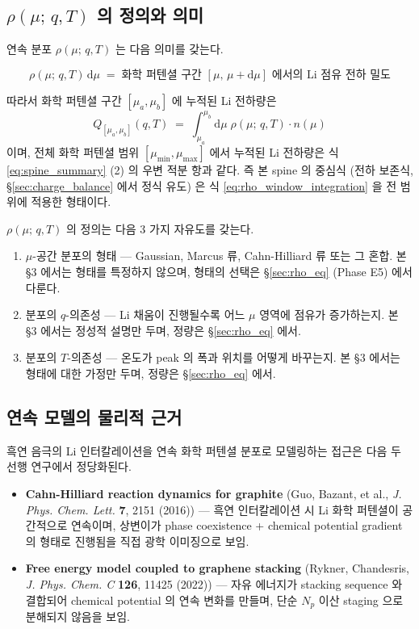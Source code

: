 \documentclass[11pt,a4paper]{article}
\newcommand{\dd}{\mathrm{d}}
\newcommand{\mucont}{\mu}
\newcommand{\rhomu}{\rho(\mucont;\, q, T)}
\newcommand{\nmu}{n(\mucont)}
\begin{document}
\subsection{$\rhomu$ 의 정의와 의미}
\label{sec:rho_definition}

연속 분포 $\rhomu$ 는 다음 의미를 갖는다.

\begin{equation}
\rhomu \, \dd\mucont \;=\;
\text{화학 퍼텐셜 구간 } [\mucont,\, \mucont + \dd\mucont] \text{ 에서의 Li
점유 전하 밀도}
\label{eq:rho_meaning}
\end{equation}

따라서 화학 퍼텐셜 구간 $[\mucont_a, \mucont_b]$ 에 누적된 Li 전하량은
\begin{equation}
Q_{[\mucont_a, \mucont_b]}(q, T)
\;=\;
\int_{\mucont_a}^{\mucont_b} \dd\mucont \; \rhomu \cdot \nmu
\label{eq:rho_window_integration}
\end{equation}
이며, 전체 화학 퍼텐셜 범위 $[\mucont_{\min}, \mucont_{\max}]$ 에서 누적된 Li
전하량은 식 \eqref{eq:spine_summary} (2) 의 우변 적분 항과 같다. 즉 본 spine 의
중심식 (전하 보존식, \S\ref{sec:charge_balance} 에서 정식 유도) 은 식
\eqref{eq:rho_window_integration} 을 전 범위에 적용한 형태이다.

$\rhomu$ 의 정의는 다음 3 가지 자유도를 갖는다.
\begin{enumerate}[label=(\alph*)]
\item $\mucont$-공간 분포의 형태 — Gaussian, Marcus 류, Cahn-Hilliard 류 또는
      그 혼합. 본 \S 3 에서는 형태를 특정하지 않으며, 형태의 선택은
      \S\ref{sec:rho_eq} (Phase E5) 에서 다룬다.
\item 분포의 $q$-의존성 — Li 채움이 진행될수록 어느 $\mucont$ 영역에 점유가
      증가하는지. 본 \S 3 에서는 정성적 설명만 두며, 정량은 \S\ref{sec:rho_eq}
      에서.
\item 분포의 $T$-의존성 — 온도가 peak 의 폭과 위치를 어떻게 바꾸는지. 본 \S 3
      에서는 형태에 대한 가정만 두며, 정량은 \S\ref{sec:rho_eq} 에서.
\end{enumerate}

\subsection{연속 모델의 물리적 근거}
\label{sec:physical_grounding}

흑연 음극의 Li 인터칼레이션을 연속 화학 퍼텐셜 분포로 모델링하는 접근은 다음 두
선행 연구에서 정당화된다.

\begin{itemize}
\item \textbf{Cahn-Hilliard reaction dynamics for graphite} (Guo, Bazant, et al.,
      \emph{J. Phys. Chem. Lett.} \textbf{7}, 2151 (2016)) — 흑연 인터칼레이션 시
      Li 화학 퍼텐셜이 공간적으로 연속이며, 상변이가 phase coexistence + chemical
      potential gradient 의 형태로 진행됨을 직접 광학 이미징으로 보임.
\item \textbf{Free energy model coupled to graphene stacking}
      (Rykner, Chandesris, \emph{J. Phys. Chem. C} \textbf{126}, 11425 (2022)) —
      자유 에너지가 stacking sequence 와 결합되어 chemical potential 의 연속
      변화를 만들며, 단순 $N_p$ 이산 staging 으로 분해되지 않음을 보임.
\end{itemize}
\end{document}
